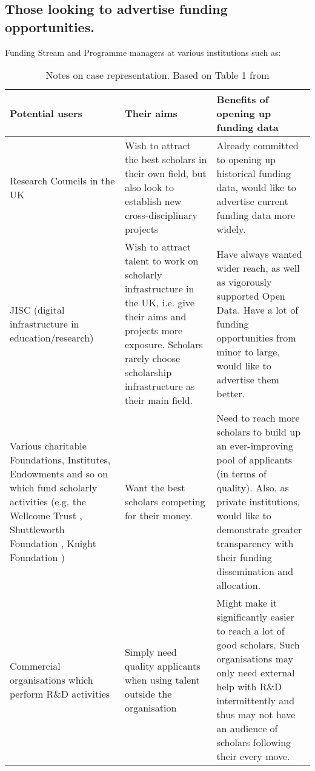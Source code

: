 \subsection{Those looking to advertise funding opportunities.}
Funding Stream and Programme managers at various institutions such as:


\bgroup
\tymin=30pt
\def\arraystretch{2}
\begin{table}
\caption{Notes on case representation. Based on Table 1 from \cite{dumbo}}
\begin{tabulary}{\linewidth}{LLL}
Potential users & Their aims & Benefits of opening up funding data \\
\hline
Research Councils in the UK & Wish to attract the best scholars in their own field, but also look to establish new cross-disciplinary  projects & Already committed to opening up historical funding data, would like to advertise current funding data more widely. \\
JISC \cite{jisc} (digital infrastructure in education/research) & Wish to attract talent to work on scholarly infrastructure in the UK, i.e. give their aims and projects more exposure. Scholars rarely choose scholarship infrastructure as their main field. & Have always wanted wider reach, as well as vigorously supported Open Data. Have a lot of funding opportunities from minor to large, would like to advertise them better.\\
Various charitable Foundations, Institutes, Endowments and so on which fund scholarly activities (e.g. the Wellcome Trust \cite{wellcome-trust}, Shuttleworth Foundation \cite{shuttleworth-foundation}, Knight Foundation \cite{knight-foundation}) & Want the best scholars competing for their money. & Need to reach more scholars to build up an ever-improving pool of applicants (in terms of quality). Also, as private institutions, would like to demonstrate greater transparency with their funding dissemination and allocation. \\
Commercial organisations which perform R\&D activities & Simply need quality applicants when using talent outside the organisation & Might make it significantly easier to reach a lot of good scholars. Such organisations may only need external help with R\&D intermittently and thus may not have an audience of scholars following their every move. \\


\end{tabulary}
\end{table}
